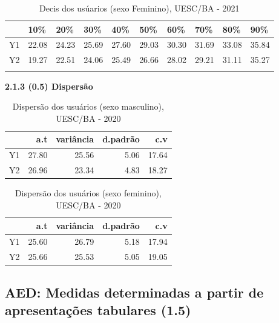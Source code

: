 \documentclass[12pt]{article}\usepackage[]{graphicx}\usepackage[]{color}
\begin{document}
\begin{table}[!ht]
  \centering
  \caption{Decis dos usúarios (sexo Feminino), UESC/BA - 2021}
\begin{tabular}{llllllllll}
\hline
   & 10\%  & 20\%  & 30\%  & 40\%  & 50\%  & 60\%  & 70\%  & 80\%  & 90\%  \\ \hline
Y1 & 22.08 & 24.23 & 25.69 & 27.60 & 29.03 & 30.30 & 31.69 & 33.08 & 35.84 \\
Y2 & 19.27 & 22.51 & 24.06 & 25.49 & 26.66 & 28.02 & 29.21 & 31.11 & 35.27 \\ \hline
   &       &       &       &       &       &       &       &       &      
\end{tabular}
\end{table}

\textbf{2.1.3 (0.5) Dispersão}
\begin{table}[!ht]
  \centering
  \caption{Dispersão dos usuários (sexo masculino), UESC/BA - 2020}
 \begin{tabular}{rrrrr}
  \toprule
 & a.t & variância & d.padrão & c.v \\ 
  \midrule
Y1 & 27.80 & 25.56 & 5.06 & 17.64 \\ 
  Y2 & 26.96 & 23.34 & 4.83 & 18.27 \\ 
   \bottomrule
\end{tabular} 
\end{table}
       
\begin{table}[!ht]
  \centering
  \caption{Dispersão dos usuários (sexo feminino), UESC/BA - 2020}
\begin{tabular}{rrrrr}
  \toprule
 & a.t & variância & d.padrão & c.v \\ 
  \midrule
Y1 & 25.60 & 26.79 & 5.18 & 17.94 \\ 
  Y2 & 25.66 & 25.53 & 5.05 & 19.05 \\ 
   \bottomrule
\end{tabular} 
\end{table}
 \clearpage
\subsection{AED: Medidas determinadas a partir de apresentações tabulares (1.5)} 
\end{document}
